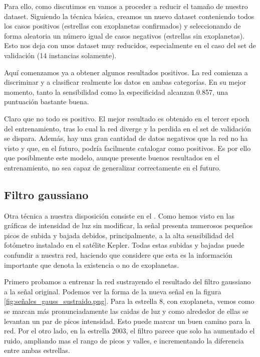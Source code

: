 Para ello, como discutimos en  vamos a proceder a reducir el tamaño de nuestro dataset. Siguiendo la técnica básica, creamos un nuevo dataset conteniendo todos los casos positivos (estrellas con exoplanetas confirmados) y seleccionando de forma aleatoria un número igual de casos negativos (estrellas sin exoplanetas). Esto nos deja con unos dataset muy reducidos, especialmente en el caso del set de validación (14 instancias solamente).

Aquí comenzamos ya a obtener algunos resultados positivos. La red comienza a discriminar y a clasificar realmente los datos en ambas categorías. En su mejor momento, tanto la sensibilidad como la especificidad alcanzan 0.857, una puntuación bastante buena. 

Claro que no todo es positivo. El mejor resultado es obtenido en el tercer epoch del entrenamiento, tras lo cual la red diverge y la perdida en el set de validación se dispara. Además, hay una gran cantidad de datos negativos que la red no ha visto y que, en el futuro, podría facilmente catalogar como positivos. Es por ello que posiblmente este modelo, aunque presente buenos resultados en el entrenamiento, no sea capaz de generalizar correctamente en el futuro.

\subsection{Filtro gaussiano}

Otra técnica a nuestra disposición consiste en el . Como hemos visto en las gráficas de intensidad de luz sin modificar, la señal presenta numerosos pequeños picos de subida y bajada debidos, principalmente, a la alta sensibilidad del fotómetro instalado en el satélite Kepler. Todas estas subidas y bajadas puede confundir a nuestra red, haciendo que considere que esta es la información importante que denota la existencia o no de exoplanetas.

Primero probamos a entrenar la red sustrayendo el resultado del filtro gaussiano a la señal original. Podemos ver la forma de la nueva señal en la figura \ref{fig:señales_gauss_sustraido.png}. Para la estrella 8, con exoplaneta, vemos como se marcan más pronunciadamente las caidas de luz y como alrededor de ellas se levantan un par de picos intensidad. Esto puede marcar un buen camino para la red. Por el otro lado, en la estrella 2003, el filtro parece que solo ha aumentado el ruido, ampliando mas el rango de picos y valles, e incrementando la diferencia entre ambas estrellas.

